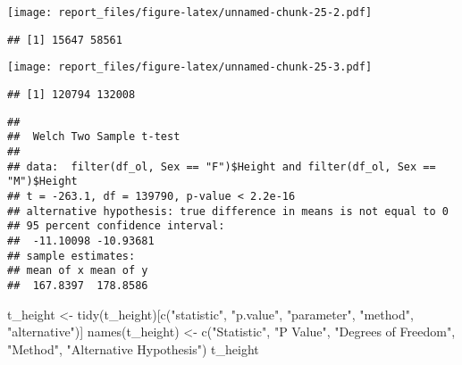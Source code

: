 \documentclass[
]{article}
\newenvironment{Shaded}{\begin{snugshade}}{\end{snugshade}}
\newcommand{\AttributeTok}[1]{\textcolor[rgb]{0.77,0.63,0.00}{#1}}
\newcommand{\CommentTok}[1]{\textcolor[rgb]{0.56,0.35,0.01}{\textit{#1}}}
\newcommand{\FunctionTok}[1]{\textcolor[rgb]{0.00,0.00,0.00}{#1}}
\newcommand{\NormalTok}[1]{#1}
\newcommand{\OtherTok}[1]{\textcolor[rgb]{0.56,0.35,0.01}{#1}}
\newcommand{\SpecialCharTok}[1]{\textcolor[rgb]{0.00,0.00,0.00}{#1}}
\newcommand{\StringTok}[1]{\textcolor[rgb]{0.31,0.60,0.02}{#1}}
\begin{document}
\texttt{[image: report\_files/figure-latex/unnamed-chunk-25-2.pdf]}

\begin{verbatim}
## [1] 15647 58561
\end{verbatim}

\begin{Shaded}
\end{Shaded}

\texttt{[image: report\_files/figure-latex/unnamed-chunk-25-3.pdf]}

\begin{verbatim}
## [1] 120794 132008
\end{verbatim}

\begin{Shaded}
\end{Shaded}

\begin{verbatim}
## 
##  Welch Two Sample t-test
## 
## data:  filter(df_ol, Sex == "F")$Height and filter(df_ol, Sex == "M")$Height
## t = -263.1, df = 139790, p-value < 2.2e-16
## alternative hypothesis: true difference in means is not equal to 0
## 95 percent confidence interval:
##  -11.10098 -10.93681
## sample estimates:
## mean of x mean of y 
##  167.8397  178.8586
\end{verbatim}

\begin{Shaded}
\begin{Highlighting}[]
\NormalTok{t\_height }\OtherTok{\textless{}{-}} \FunctionTok{tidy}\NormalTok{(t\_height)[}\FunctionTok{c}\NormalTok{(}\StringTok{"statistic"}\NormalTok{, }\StringTok{"p.value"}\NormalTok{, }\StringTok{"parameter"}\NormalTok{, }\StringTok{"method"}\NormalTok{, }\StringTok{"alternative"}\NormalTok{)]}
\FunctionTok{names}\NormalTok{(t\_height) }\OtherTok{\textless{}{-}} \FunctionTok{c}\NormalTok{(}\StringTok{"Statistic"}\NormalTok{, }\StringTok{"P Value"}\NormalTok{, }\StringTok{"Degrees of Freedom"}\NormalTok{, }\StringTok{"Method"}\NormalTok{, }\StringTok{"Alternative Hypothesis"}\NormalTok{)}
\NormalTok{t\_height}
\end{Highlighting}
\end{Shaded}
\end{document}
